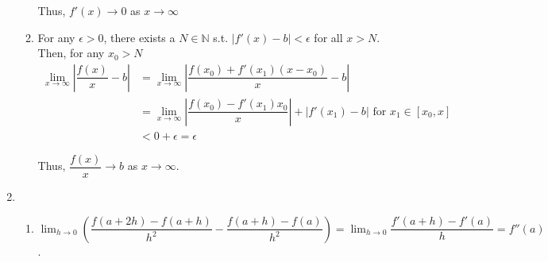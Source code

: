 \documentclass[12pt]{article}
\begin{document}
\begin{enumerate}
\begin{enumerate}
        Thus, $f'(x) \to 0$ as $x\to \infty$

        \newpage
        \item For any $\epsilon > 0$, there exists a $N\in\mathbb{N}$ s.t. $|f'(x) - b| < \epsilon$ for all $x > N$.
        Then, for any $x_0 > N$
        \begin{align*}
            \lim_{x\to\infty}|\dfrac{f(x)}{x} - b| &= \lim_{x\to\infty}|\dfrac{f(x_0) + f'(x_1)(x-x_0)}{x} - b|\\
            &=\lim_{x\to\infty} |\dfrac{f(x_0)- f'(x_1)x_0}{x}| + |f'(x_1) - b|\text{ for } x_1\in [x_0, x]\\
            &< 0 + \epsilon = \epsilon
        \end{align*}

        Thus, $\dfrac{f(x)}{x} \to b$ as $x\to\infty$.
    \end{enumerate}

    \item\begin{enumerate}
        \item $\displaystyle\lim_{h\to 0}(\dfrac{f(a+2h) - f(a+h)}{h^2} - \dfrac{f(a+h) - f(a)}{h^2}) = \displaystyle\lim_{h\to 0} \dfrac{f'(a+h) - f'(a)}{h}= f''(a)$.
    \end{enumerate}
\end{enumerate}
\end{document}
